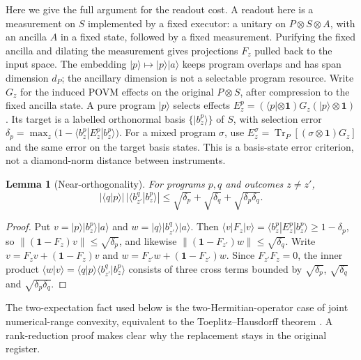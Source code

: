 \documentclass[12pt,a4paper]{article}
\newtheorem{lemma}[theorem]{Lemma}
\newcommand{\ket}[1]{|#1\rangle}
\newcommand{\bra}[1]{\langle #1|}
\newcommand{\Tr}{\operatorname{Tr}}
\begin{document}
Here we give the full argument for the readout cost. A readout here is a measurement on $S$ implemented by a fixed executor: a unitary on $P\otimes S\otimes A$, with an ancilla $A$ in a fixed state, followed by a fixed measurement. Purifying the fixed ancilla and dilating the measurement gives projections $F_z$ pulled back to the input space. The embedding $\ket p\mapsto\ket p\ket a$ keeps program overlaps and has span dimension $d_P$; the ancillary dimension is not a selectable program resource. Write $G_z$ for the induced POVM effects on the original $P\otimes S$, after compression to the fixed ancilla state. A pure program $\ket p$ selects effects $E^p_z=(\bra p\otimes\mathbf 1)G_z(\ket p\otimes\mathbf 1)$. Its target is a labelled orthonormal basis $\{\ket{b^p_z}\}$ of $S$, with selection error $\delta_p=\max_z\bigl(1-\langle b^p_z|E^p_z|b^p_z\rangle\bigr)$. For a mixed program $\sigma$, use $E^\sigma_z=\Tr_P[(\sigma\otimes\mathbf 1)G_z]$ and the same error on the target basis states. This is a basis-state error criterion, not a diamond-norm distance between instruments.

\begin{lemma}[Near-orthogonality]
\label{lem:near}
For programs $p,q$ and outcomes $z\ne z'$,
\[
|\langle q|p\rangle|\,|\langle b^q_{z'}|b^p_z\rangle|\le\sqrt{\delta_p}+\sqrt{\delta_q}+\sqrt{\delta_p\delta_q}.
\]
\end{lemma}

\begin{proof}
Put $v=\ket p\ket{b^p_z}\ket a$ and $w=\ket q\ket{b^q_{z'}}\ket a$. Then $\langle v|F_z|v\rangle=\langle b^p_z|E^p_z|b^p_z\rangle\ge1-\delta_p$, so $\|(\mathbf 1-F_z)v\|\le\sqrt{\delta_p}$, and likewise $\|(\mathbf 1-F_{z'})w\|\le\sqrt{\delta_q}$. Write $v=F_zv+(\mathbf 1-F_z)v$ and $w=F_{z'}w+(\mathbf 1-F_{z'})w$. Since $F_{z'}F_z=0$, the inner product $\langle w|v\rangle=\langle q|p\rangle\langle b^q_{z'}|b^p_z\rangle$ consists of three cross terms bounded by $\sqrt{\delta_p}$, $\sqrt{\delta_q}$ and $\sqrt{\delta_p\delta_q}$.
\end{proof}

The two-expectation fact used below is the two-Hermitian-operator case of joint numerical-range convexity, equivalent to the Toeplitz--Hausdorff theorem \cite{GutkinJonckheereKarow2004}. A rank-reduction proof makes clear why the replacement stays in the original register.
\end{document}
